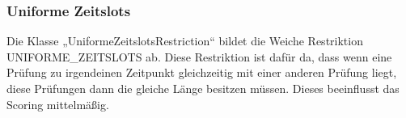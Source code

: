 \subsubsection{Uniforme Zeitslots}\label{subsubsec:uniformeZeitslots}
Die Klasse „UniformeZeitslotsRestriction“ bildet die Weiche Restriktion UNIFORME\_ZEITSLOTS ab.
Diese Restriktion ist dafür da, dass wenn eine Prüfung zu irgendeinen Zeitpunkt gleichzeitig mit einer anderen Prüfung liegt, diese Prüfungen dann die gleiche Länge besitzen müssen.
Dieses beeinflusst das Scoring mittelmäßig.
